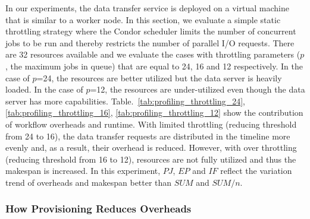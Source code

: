 In our experiments, the data transfer service is deployed on a virtual machine that is similar to a worker node.  In this section, we evaluate a simple static throttling strategy where the Condor scheduler limits the number of concurrent jobs to be run and thereby restricts the number of parallel I/O requests. There are 32 resources available and we evaluate the cases with throttling parameters ($p$, the maximum jobs in queue) that are equal to 24, 16 and 12 respectively. In the case of $p$=24, the resources are better utilized but the data server is heavily loaded. In the case of $p$=12, the resources are under-utilized even though the data server has more capabilities. Table.~\ref{tab:profiling_throttling_24}, \ref{tab:profiling_throttling_16}, \ref{tab:profiling_throttling_12} show the contribution of workflow overheads and runtime. With limited throttling (reducing threshold from 24 to 16), the data transfer requests are distributed in the timeline more evenly and, as a result, their overhead is reduced. However, with over throttling (reducing threshold from 16 to 12), resources are not fully utilized and thus the makespan is increased. In this experiment, $PJ$, $EP$ and $IF$ reflect the variation trend of overheads and makespan better than $SUM$ and $SUM/n$. 



\subsubsection{How Provisioning Reduces Overheads}

